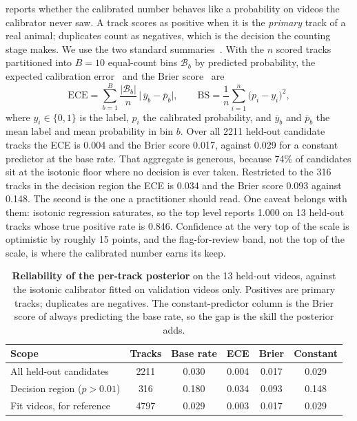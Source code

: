  reports whether the calibrated number behaves like a probability on videos
the calibrator never saw. A track scores as positive when it is the \emph{primary} track of a
real animal; duplicates count as negatives, which is the decision the counting stage makes.
We use the two standard summaries~\cite{guo2017calibration}. With the $n$ scored tracks
partitioned into $B=10$ equal-count bins $\mathcal{B}_b$ by predicted probability, the
expected calibration error~\cite{naeini2015obtaining} and the Brier
score~\cite{brier1950verification} are
\begin{equation}
\mathrm{ECE}=\sum_{b=1}^{B}\frac{|\mathcal{B}_b|}{n}\,\bigl|\,\overline{y}_b-\overline{p}_b\bigr|,
\qquad
\mathrm{BS}=\frac{1}{n}\sum_{i=1}^{n}\bigl(p_i-y_i\bigr)^2,
\label{eq:ece}
\end{equation}
where $y_i\in\{0,1\}$ is the label, $p_i$ the calibrated probability, and $\overline{y}_b$
and $\overline{p}_b$ the mean label and mean probability in bin $b$. Over all 2211 held-out
candidate tracks the ECE is 0.004 and the Brier score 0.017, against 0.029 for a constant
predictor at the base rate. That aggregate is generous, because 74\% of candidates sit at
the isotonic floor where no decision is ever taken. Restricted to the 316 tracks in the
decision region the ECE is 0.034 and the Brier score 0.093 against 0.148. The second is the one a practitioner should read. One caveat belongs with them:
isotonic regression saturates, so the top level reports 1.000 on 13 held-out tracks whose
true positive rate is 0.846. Confidence at the very top of the scale is optimistic by
roughly 15 points, and the flag-for-review band, not the top of the scale, is where the
calibrated number earns its keep.

\begin{table}[htbp]
\caption{\textbf{Reliability of the per-track posterior} on the 13 held-out videos, against
the isotonic calibrator fitted on validation videos only. Positives are primary tracks;
duplicates are negatives. The constant-predictor column is the Brier score of always
predicting the base rate, so the gap is the skill the posterior
adds.\label{tab:calib}}
\centering\footnotesize
\begin{tabularx}{\textwidth}{LCCCCC}
\toprule
\textbf{Scope} & \textbf{Tracks} & \textbf{Base rate} & \textbf{ECE} & \textbf{Brier} & \textbf{Constant} \\
\midrule
All held-out candidates & 2211 & 0.030 & 0.004 & 0.017 & 0.029 \\
Decision region ($p>0.01$) & 316 & 0.180 & 0.034 & 0.093 & 0.148 \\
\midrule
Fit videos, for reference & 4797 & 0.029 & 0.003 & 0.017 & 0.029 \\
\bottomrule
\end{tabularx}
\end{table}

